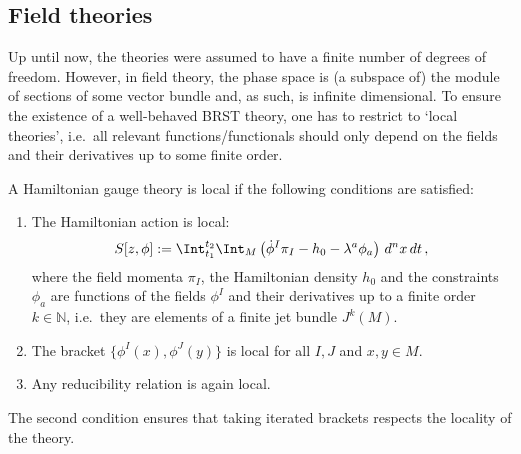 
\subsection{Field theories}

    Up until now, the theories were assumed to have a finite number of degrees of freedom. However, in field theory, the phase space is (a subspace of) the module of sections of some vector bundle and, as such, is infinite dimensional. To ensure the existence of a well-behaved BRST theory, one has to restrict to `local theories', i.e.~all relevant functions/functionals should only depend on the fields and their derivatives up to some finite order.
    \begin{axiom}[Locality]
        A Hamiltonian gauge theory is local if the following conditions are satisfied:
        \begin{enumerate}
            \item The Hamiltonian action is local:
            \begin{gather}
                \label{constraint:hamiltonian_action}
                S[z,\phi] := \Int_{t_1}^{t_2}\Int_M\left(\dot{\phi}^I\pi_I-h_0-\lambda^a\phi_a\right)\,d^nx\,dt\,,
            \end{gather}
            where the field momenta $\pi_I$, the Hamiltonian density $h_0$ and the constraints $\phi_a$ are functions of the fields $\phi^I$ and their derivatives up to a finite order $k\in\mathbb{N}$, i.e.~they are elements of a finite jet bundle $J^k(M)$.
            \item The bracket $\{\phi^I(x),\phi^J(y)\}$ is local for all $I,J$ and $x,y\in M$.
            \item Any reducibility relation is again local.
        \end{enumerate}
        The second condition ensures that taking iterated brackets respects the locality of the theory.
    \end{axiom}

